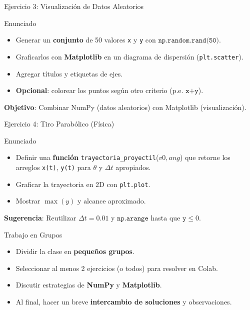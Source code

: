 \documentclass[10pt]{beamer}
\begin{document}
\begin{frame}{Ejercicio 3: Visualización de Datos Aleatorios}
  \begin{block}{Enunciado}
    \begin{itemize}
      \item Generar un \textbf{conjunto} de 50 valores \texttt{x} y \texttt{y} con \(\texttt{np.random.rand(50)}\).
      \item Graficarlos con \textbf{Matplotlib} en un diagrama de dispersión (\texttt{plt.scatter}).
      \item Agregar títulos y etiquetas de ejes.
      \item \textbf{Opcional}: colorear los puntos según otro criterio (p.e. \(\texttt{x+y}\)).
    \end{itemize}
  \end{block}
  \textbf{Objetivo}: Combinar NumPy (datos aleatorios) con Matplotlib (visualización).
\end{frame}

\begin{frame}{Ejercicio 4: Tiro Parabólico (Física)}
  \begin{block}{Enunciado}
    \begin{itemize}
      \item Definir una \textbf{función} \texttt{trayectoria\_proyectil}(\(v0, ang\)) que retorne los arreglos \texttt{x(t)}, \texttt{y(t)} para \(\theta\) y \(\Delta t\) apropiados.
      \item Graficar la trayectoria en 2D con \texttt{plt.plot}.
      \item Mostrar \(\max(y)\) y \(\text{alcance}\) aproximado.
    \end{itemize}
  \end{block}
  \textbf{Sugerencia}: Reutilizar \(\Delta t = 0.01\) y \(\texttt{np.arange}\) hasta que \(\texttt{y} \le 0\).
\end{frame}

\begin{frame}{Trabajo en Grupos}
  \begin{itemize}
    \item Dividir la clase en \textbf{pequeños grupos}.
    \item Seleccionar al menos 2 ejercicios (o todos) para resolver en Colab.
    \item Discutir estrategias de \textbf{NumPy} y \textbf{Matplotlib}.
    \item Al final, hacer un breve \textbf{intercambio de soluciones} y observaciones.
  \end{itemize}
\end{frame}
\end{document}
